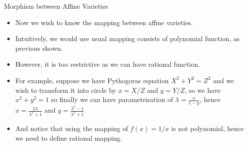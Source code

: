 \documentclass[8pt]{beamer}
\theoremstyle{definition}
\begin{document}
    \begin{frame}{Morphism between Affine Varieties}
        \begin{itemize}
            \item Now we wish to know the mapping between affine varieties. 
            \item Intuitively, we would use usual mapping consists of polynomial function, as previous shown.
            \item However, it is too restrictive as we can have rational function.
            \item For example, suppose we have Pythogoras equation $X^2 + Y^2 = Z^2$ and we wish to transform it into circle by $x = X/Z$ and $y = Y/Z$, so we have $x^2 + y^2 = 1$ so finally we can have parametrisation of $\lambda = \frac{x}{1-y}$, hence $x = \frac{2 \lambda}{\lambda^2 + 1}$ and $y = \frac{\lambda^2 - 1}{\lambda^2 + 1}$   
            \item And notice that using the mapping of $f(x) = 1/x$ is not polynomial, hence we need to define rational mapping.
        \end{itemize}
        
    \end{frame}
\end{document}
